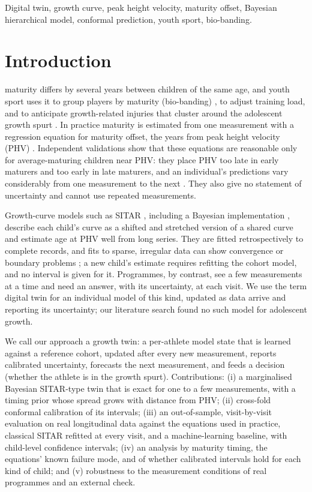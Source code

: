 \documentclass[journal]{IEEEtran}
\begin{document}
\begin{IEEEkeywords}
Digital twin, growth curve, peak height velocity, maturity offset, Bayesian hierarchical model,
conformal prediction, youth sport, bio-banding.
\end{IEEEkeywords}

\section{Introduction}
 maturity differs by several years between children of the same age,
and youth sport uses it to group players by maturity (bio-banding) \cite{cumming2017biobanding},
to adjust training load, and to anticipate growth-related injuries that cluster around the
adolescent growth spurt \cite{hall2025,oxendale2025}. In practice maturity is estimated from one
measurement with a regression equation for maturity offset, the years from peak height velocity
(PHV) \cite{mirwald2002,moore2015}. Independent validations show that these equations are
reasonable only for average-maturing children near PHV: they place PHV too late in early maturers
and too early in late maturers, and an individual's predictions vary considerably from one
measurement to the next \cite{koziel2018modified,malina2021soccer}. They also give no statement of
uncertainty and cannot use repeated measurements.

Growth-curve models such as SITAR \cite{cole2010sitar}, including a Bayesian implementation
\cite{bsitar}, describe each child's curve as a shifted and stretched version of a shared curve and
estimate age at PHV well from long series. They are fitted retrospectively to complete records,
and fits to sparse, irregular data can show convergence or boundary problems
\cite{carvalho2025sitar}; a new child's estimate requires refitting the cohort model, and no
interval is given for it. Programmes, by contrast, see a few measurements at a time and need an
answer, with its uncertainty, at each visit. We use the term digital twin for an individual model of this kind, updated as
data arrive and reporting its uncertainty; our literature search found no such model for
adolescent growth.

We call our approach a growth twin: a per-athlete model state that is learned against a reference
cohort, updated after every new measurement, reports calibrated uncertainty, forecasts the next
measurement, and feeds a decision (whether the athlete is in the growth spurt). Contributions:
(i) a marginalised Bayesian SITAR-type twin that is exact for one to a few measurements, with a
timing prior whose spread grows with distance from PHV; (ii) cross-fold conformal calibration of
its intervals; (iii) an out-of-sample, visit-by-visit evaluation on real longitudinal data against
the equations used in practice, classical SITAR refitted at every visit, and a machine-learning
baseline, with child-level confidence intervals; (iv) an analysis by maturity timing, the
equations' known failure mode, and of whether calibrated intervals hold for each kind of child;
and (v) robustness to the measurement conditions of real programmes and an external check.
\end{document}

